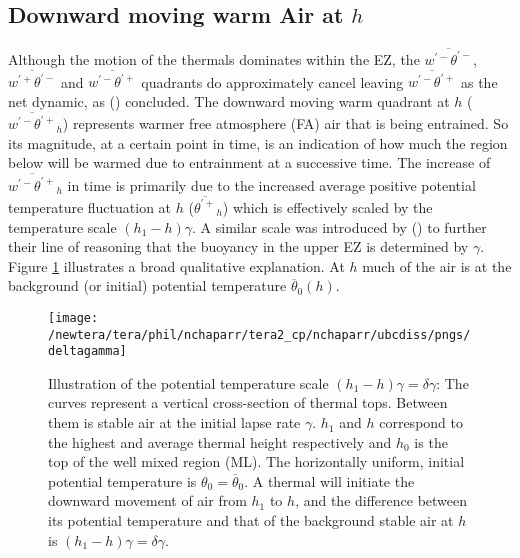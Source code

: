 \subsection{Downward moving warm Air at $h$}

 Although the motion of the thermals dominates within the \acs{EZ}, the $\overline{w^{'-}\theta^{'-}}$, $\overline{w^{'+}\theta^{'-}}$ and $\overline{w^{'-}\theta^{'+}}$ quadrants do approximately cancel leaving $\overline{w^{'-}\theta^{'+}}$ as the net dynamic, as \citeauthor{SullMoengStev} (\citeyear{SullMoengStev}) concluded. The downward moving warm quadrant at $h$ ($\overline{w^{'-}\theta^{'+}}_{h}$) represents warmer free atmosphere (\acs{FA}) air that is being entrained.  So its magnitude, at a certain point in time, is an indication of how much the region below will be warmed due to entrainment at a successive time.  The increase of $\overline{w^{'-}\theta^{'+}}_{h}$ in time is primarily due to the increased average positive potential temperature fluctuation at $h$ ($\overline{\theta^{'+}}_{h}$) which is effectively scaled by the temperature scale $(h_{1}-h)\gamma$.  A similar scale was introduced by \citeauthor{GarciaMellado} (\citeyear{GarciaMellado}) to further their line of reasoning that the buoyancy in the upper \acs{EZ} is determined by $\gamma$. Figure \ref{fig:deltagamma} illustrates a broad qualitative explanation.  At $h$ much of the air is at the background (or initial) potential temperature $\overline{\theta}_{0}(h)$. 

\begin{figure}[htbp]
    \centering
    \texttt{[image: /newtera/tera/phil/nchaparr/tera2\_cp/nchaparr/ubcdiss/pngs/deltagamma]}
    \caption[Illustration of \acs{EZ} Potential Temperature Scale based on $\gamma$]{Illustration of the potential temperature scale $(h_{1}-h)\gamma = \delta \gamma$: The curves represent a vertical cross-section of thermal tops.  Between them is stable air at the initial lapse rate $\gamma$. $h_{1}$ and $h$ correspond to the highest and average thermal height respectively and $h_{0}$ is the top of the well mixed region (\acs{ML}).  The horizontally uniform, initial potential temperature is $\theta_{0} = \overline{\theta}_{0}$. A thermal will initiate the downward movement of air from $h_{1}$ to $h$, and the difference between its potential temperature and that of the background stable air at $h$ is $(h_{1}-h)\gamma = \delta \gamma$.}
    \label{fig:deltagamma}   %
\end{figure}

